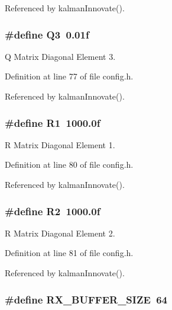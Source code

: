 Referenced by kalman\-Innovate().

\hypertarget{group__config_ga1d7d3dfd2c4618949c484c5e8369f05a}{
\subsubsection[{Q3}]{\setlength{\rightskip}{0pt plus 5cm}\#define Q3~0.\-01f}}\label{group__config_ga1d7d3dfd2c4618949c484c5e8369f05a}


Q Matrix Diagonal Element 3. 



Definition at line 77 of file config.\-h.



Referenced by kalman\-Innovate().

\hypertarget{group__config_ga918f64eb53db8e8dc694f36a87646476}{
\subsubsection[{R1}]{\setlength{\rightskip}{0pt plus 5cm}\#define R1~1000.\-0f}}\label{group__config_ga918f64eb53db8e8dc694f36a87646476}


R Matrix Diagonal Element 1. 



Definition at line 80 of file config.\-h.



Referenced by kalman\-Innovate().

\hypertarget{group__config_ga7a255a2815b9453060f51c6eb22cfed8}{
\subsubsection[{R2}]{\setlength{\rightskip}{0pt plus 5cm}\#define R2~1000.\-0f}}\label{group__config_ga7a255a2815b9453060f51c6eb22cfed8}


R Matrix Diagonal Element 2. 



Definition at line 81 of file config.\-h.



Referenced by kalman\-Innovate().

\hypertarget{group__config_ga739a2a1a0047c98ac1b18ecd25dac092}{
\subsubsection[{R\-X\-\_\-\-B\-U\-F\-F\-E\-R\-\_\-\-S\-I\-Z\-E}]{\setlength{\rightskip}{0pt plus 5cm}\#define R\-X\-\_\-\-B\-U\-F\-F\-E\-R\-\_\-\-S\-I\-Z\-E~64}}\label{group__config_ga739a2a1a0047c98ac1b18ecd25dac092}


